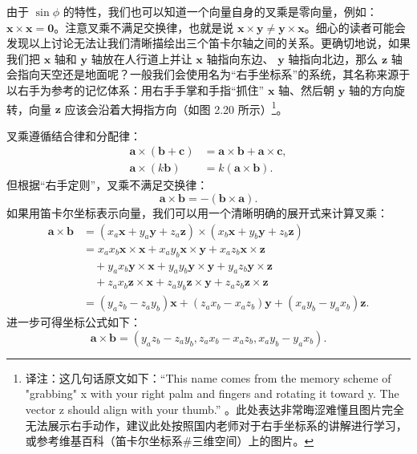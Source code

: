 由于 $\sin\phi$ 的特性，我们也可以知道一个向量自身的叉乘是零向量，例如：$\mathbf{x}\times\mathbf{x}=\mathbf{0}$。注意叉乘不满足交换律，也就是说 $\mathbf{x}\times\mathbf{y} \neq \mathbf{y}\times\mathbf{x}$。细心的读者可能会发现以上讨论无法让我们清晰描绘出三个笛卡尔轴之间的关系。更确切地说，如果我们把 $\mathbf{x}$ 轴和 $\mathbf{y}$ 轴放在人行道上并让 $\mathbf{x}$ 轴指向东边、 $\mathbf{y}$ 轴指向北边，那么 $\mathbf{z}$ 轴会指向天空还是地面呢？一般我们会使用名为“右手坐标系”的系统，其名称来源于以右手为参考的记忆体系：用右手手掌和手指“抓住” $\mathbf{x}$ 轴、然后朝 $\mathbf{y}$ 轴的方向旋转，向量 $\mathbf{z}$ 应该会沿着大拇指方向（如图 2.20 所示）\footnote[1]{译注：这几句话原文如下：“This name comes from the memory scheme of "grabbing" x with your right palm and fingers and rotating it toward y. The vector z should align with your thumb.” 。此处表达非常晦涩难懂且图片完全无法展示右手动作，建议此处按照国内老师对于右手坐标系的讲解进行学习，或参考维基百科（笛卡尔坐标系\#三维空间）上的图片。}。


叉乘遵循结合律和分配律：
\[
  \begin{aligned}
    \mathbf{a}\times(\mathbf{b}+\mathbf{c}) & =\mathbf{a}\times\mathbf{b}+\mathbf{a}\times\mathbf{c}, \\
    \mathbf{a}\times(k\mathbf{b})           & =k(\mathbf{a}\times\mathbf{b}).
  \end{aligned}
\]
但根据“右手定则”，叉乘不满足交换律：
\[
  \mathbf{a}\times\mathbf{b}=-(\mathbf{b}\times\mathbf{a}).
\]
如果用笛卡尔坐标表示向量，我们可以用一个清晰明确的展开式来计算叉乘：
\begin{equation}
  \begin{aligned}
    \mathbf{a}\times\mathbf{b}
     & =(x_{a}\mathbf{x}+y_{a}\mathbf{y}+z_{a}\mathbf{z})\times(x_{b}\mathbf{x}+y_{b}\mathbf{y}+z_{b}\mathbf{z})             \\
     & =x_{a}x_{b}\mathbf{x}\times\mathbf{x}+x_{a}y_{b}\mathbf{x}\times\mathbf{y}+x_{a}z_{b}\mathbf{x}\times\mathbf{z}       \\
     & \quad +y_{a}x_{b}\mathbf{y}\times\mathbf{x}+y_{a}y_{b}\mathbf{y}\times\mathbf{y}+y_{a}z_{b}\mathbf{y}\times\mathbf{z} \\
     & \quad +z_{a}x_{b}\mathbf{z}\times\mathbf{x}+z_{a}y_{b}\mathbf{z}\times\mathbf{y}+z_{a}z_{b}\mathbf{z}\times\mathbf{z} \\
     & =(y_{a}z_{b}-z_{a}y_{b})\mathbf{x}+(z_{a}x_{b}-x_{a}z_{b})\mathbf{y}+(x_{a}y_{b}-y_{a}x_{b})\mathbf{z}.
  \end{aligned}
\end{equation}
进一步可得坐标公式如下：
\begin{equation}
  \mathbf{a}\times\mathbf{b}=(y_{a}z_{b}-z_{a}y_{b},z_{a}x_{b}-x_{a}z_{b},x_{a}y_{b}-y_{a}x_{b}).
\end{equation}

